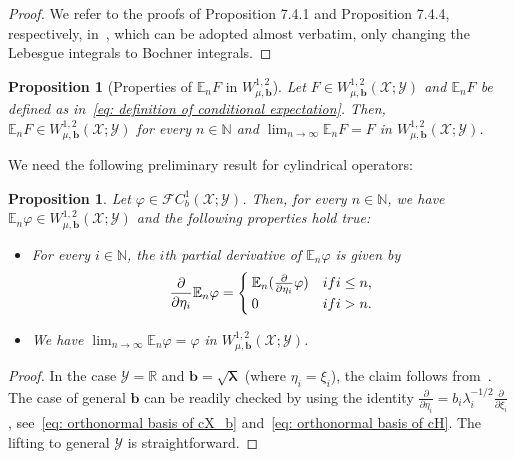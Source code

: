 \documentclass[namedate,webpdf]{ima-authoring-template-blank}
\newcounter{counter}
\numberwithin{counter}{section}
\numberwithin{equation}{section}
\theoremstyle{plain}
\newtheorem{proposition}[counter]{Proposition}
\theoremstyle{definition}
\newcommand*{\cF}{\mathcal{F}}
\newcommand*{\cX}{\mathcal{X}}
\newcommand*{\cY}{\mathcal{Y}}
\newcommand*{\bbE}{\mathbb{E}}
\newcommand*{\bbN}{\mathbb{N}}
\newcommand*{\bbR}{\mathbb{R}}
\theoremstyle{thmstyletwo}
\begin{document}
\begin{proof}
    We refer to the proofs of Proposition 7.4.1 and Proposition 7.4.4, respectively, in~\citet{lunardi_InfiniteDimensionalAnalysis_2015}, which can be adopted almost verbatim, only changing the Lebesgue integrals to Bochner integrals.
\end{proof}

\begin{proposition}[Properties of \(\bbE_n F\) in \(W_{\mu, \bm{b}}^{1, 2}\)]
\label{prop: properties of conditional expectation in W12}
    Let \(F \in W_{\mu, \bm{b}}^{1, 2}(\cX; \cY)\) and \(\bbE_n F\) be defined as in~\eqref{eq: definition of conditional expectation}. Then, \(\bbE_n F \in W_{\mu, \bm{b}}^{1, 2}(\cX; \cY)\) for every \(n \in \bbN\) and 
    \(
    \lim_{n \to \infty} \bbE_n F = F
    \)
    in \(W_{\mu, \bm{b}}^{1, 2}(\cX; \cY)\).
\end{proposition}

We need the following preliminary result for cylindrical operators:
\begin{proposition}
\label{prop: properties of conditional expectation in W12; cylindrical functionals}
    Let \( \varphi \in \cF C_b^1(\cX;\cY) \). Then, for every \( n \in \bbN \), we have \( \bbE_n \varphi \in W_{\mu, \bm{b}}^{1, 2}(\cX;\cY) \) and the following properties hold true:
    \begin{itemize}
        \item [(i)] For every \( i \in \bbN \), the \( i \)th partial derivative of \( \bbE_n \varphi \) is given by
        \[
        \frac{\partial}{\partial \eta_i} \bbE_n \varphi = 
        \begin{cases}
            \bbE_n (\frac{\partial}{\partial \eta_i} \varphi) & \textup{if } i \leq n, \\
            0 & \textup{if } i > n.
        \end{cases}
        \]
        \item [(ii)] We have \( \lim_{n \to \infty} \bbE_n \varphi = \varphi  \) in \( W_{\mu, \bm{b}}^{1, 2}(\cX;\cY) \).
    \end{itemize}
\end{proposition}

\begin{proof}
    In the case \( \cY = \bbR \) and \( \bm{b} = \sqrt{\bm{\lambda}} \) (where \( \eta_ i = \xi_i \)), the claim follows from~\citet[Prop. 10.1.2]{lunardi_InfiniteDimensionalAnalysis_2015}. The case of general \( \bm{b} \) can be readily checked by using the identity \( \frac{\partial}{\partial \eta_i} = b_i \lambda_i^{-1/2} \frac{\partial}{\partial \xi_i} \), see~\eqref{eq: orthonormal basis of cX_b} and~\eqref{eq: orthonormal basis of cH}. The lifting to general \( \cY \) is straightforward.
\end{proof}
\end{document}
